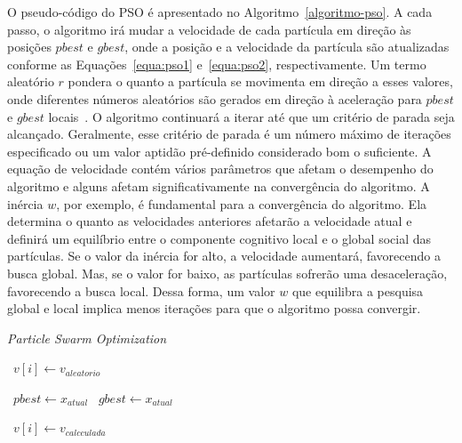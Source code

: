 O pseudo-código do PSO é apresentado no Algoritmo~\ref{algoritmo-pso}. A cada passo, o algoritmo irá mudar a velocidade de cada partícula em direção às posições $ pbest $ e $ gbest $, onde a posição e a velocidade da partícula são atualizadas conforme as Equações~\ref{equa:pso1} e~\ref{equa:pso2}, respectivamente. Um termo aleatório $ r $ pondera o quanto a partícula se movimenta em direção a esses valores, onde diferentes números aleatórios são gerados em direção à aceleração para $ pbest $ e $ gbest $ locais~\cite{lazinica2009}. O algoritmo continuará a iterar até que um critério de parada seja alcançado. Geralmente, esse critério de parada é um número máximo de iterações especificado ou um valor aptidão pré-definido considerado bom o suficiente. A equação de velocidade contém vários parâmetros que afetam o desempenho do algoritmo e alguns afetam significativamente na convergência do algoritmo. A inércia $ w $, por exemplo, é fundamental para a convergência do algoritmo. Ela determina o quanto as velocidades anteriores afetarão a velocidade atual e definirá um equilíbrio entre o componente cognitivo local e o global social das partículas. Se o valor da inércia for alto, a velocidade aumentará, favorecendo a busca global. Mas, se o valor for baixo, as partículas sofrerão uma desaceleração, favorecendo a busca local. Dessa forma, um valor $ w $ que equilibra a pesquisa global e local implica menos iterações para que o algoritmo possa convergir.
\begin{algorithm}
	\caption{\textit{Particle Swarm Optimization}}
	\begin{algorithmic}[1]
		 
		 
		\ {$ v[i]  \gets v _{aleatorio}$}
		 
			 
			
				  
					\ {$ pbest  \gets x _{atual}$}	 
				\EndIf
				   
					\ {$ gbest  \gets x _{atual}$}
				\EndIf	
				
				 
				
					 \ {$ v[i]  \gets v _{calcculada}$} 	
			\EndFor
		\EndWhile	
	\end{algorithmic}
	\label{algoritmo-pso}
\end{algorithm}
